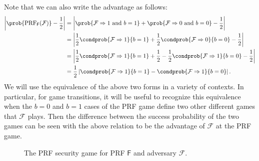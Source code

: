 \iffullversion
Note that we can also write the advantage as follows:
\begin{align*}
\left\lvert \prob{\text{PRF}_\mathsf{F}(\mathcal{F})}-\frac{1}{2} \right\rvert
&=\left\lvert \prob{\mathcal{F}\Rightarrow 1 \text{ and } b=1} + \prob{\mathcal{F}\Rightarrow 0 \text{ and } b=0} -\frac{1}{2} \right\rvert \\
&=\left\lvert \frac{1}{2}\condprob{\mathcal{F}\Rightarrow 1}{b=1} + \frac{1}{2}\condprob{\mathcal{F}\Rightarrow 0}{b=0} -\frac{1}{2} \right\rvert \\
&=\left\lvert \frac{1}{2}\condprob{\mathcal{F}\Rightarrow 1}{b=1} + \frac{1}{2} - \frac{1}{2}\condprob{\mathcal{F}\Rightarrow 1}{b=0} -\frac{1}{2} \right\rvert \\
&=\frac{1}{2} \left\lvert \condprob{\mathcal{F}\Rightarrow 1}{b=1} - \condprob{\mathcal{F}\Rightarrow 1}{b=0} \right\rvert. \\
\end{align*}
We will use the equivalence of the above two forms in a variety of contexts. In particular, for game transitions, it will be useful to recognize this equivalence when the $b=0$ and $b=1$ cases of the PRF game define two other different games that $\mathcal{F}$ plays. Then the difference between the success probability of the two games can be seen with the above relation to be the advantage of $\mathcal{F}$ at the PRF game.
\fi

\begin{figure}
\centering
\begin{pchstack}
\pchspace
{}
\end{pchstack}
\caption[The PRF security game]{The PRF security game for PRF $\mathsf{F}$ and adversary $\mathcal{F}$.}
\label{game:prfgame}
\end{figure}

